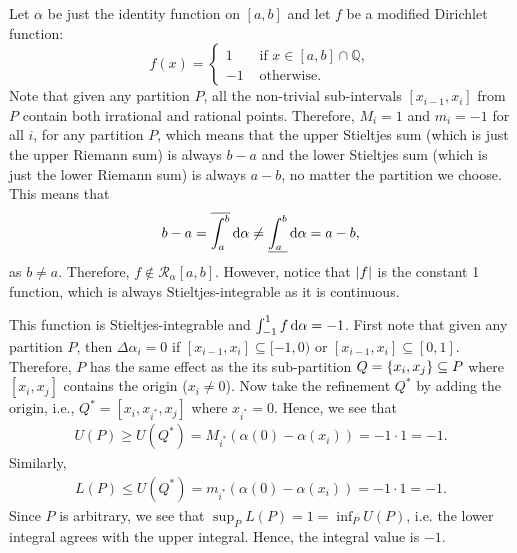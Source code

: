\documentclass[12pt]{article}
\begin{document}
\begin{fproof}[3]
  Let \(\alpha\) be just the identity function on \([a,b]\) and let \(f\) be a modified Dirichlet function:
\[
f(x) = \begin{cases}
  1 &\text{ if } x \in [a,b] \cap \mathbb{Q},\\
  -1 &\text{ otherwise.}
\end{cases}
\]
Note that given any partition \(P\), all the non-trivial sub-intervals \([x_{i-1}, x_i]\) from \(P\) contain both irrational and rational points.
Therefore, \(M_i = 1\) and \(m_i = -1\) for all \(i\), for any partition \(P\), which means that the upper Stieltjes sum (which is just the upper Riemann sum) is always \(b-a\) and the lower Stieltjes sum (which is just the lower Riemann sum) is always \(a-b\), no matter the partition we choose.
This means that
\begin{align*}
  b-a = \overline{\int_{a}^{b}} \mathop{}\!\mathrm{d}\alpha \neq \underline{\int_{a}^{b}} \mathop{}\!\mathrm{d}\alpha = a-b,
\end{align*}
as \(b \neq a\).
Therefore, \(f \notin \mathcal{R}_{\alpha}[a,b]\).
However, notice that \(\left\lvert f \right\rvert\) is the constant 1 function, which is always Stieltjes-integrable as it is continuous.
\end{fproof}
\newpage

\begin{fproof}[4(a)]
  This function is Stieltjes-integrable and \(\int_{-1}^{1} f \mathop{}\!\mathrm{d}\alpha = -1\).
  First note that given any partition \(P\), then \(\Delta \alpha_i = 0\) if \([x_{i-1}, x_i] \subseteq [-1,0)\) or \([x_{i-1}, x_i] \subseteq [0,1]\).
  Therefore, \(P\) has the same effect as the its sub-partition \(Q = \left\{ x_i,x_j \right\}\subseteq P\) where \([x_i,x_j]\) contains the origin (\(x_i \neq 0\)).
  Now take the refinement \(Q^*\) by adding the origin, i.e., \(Q^* = [x_i, x_{i^*}, x_j]\) where \(x_{i^*} = 0\).
  Hence, we see that 
  \begin{align*}
    U(P) \geq U(Q^*) = M_{i^*} (\alpha(0) - \alpha(x_i)) = -1 \cdot 1  = -1.
  \end{align*}
  Similarly,
  \begin{align*}
    L(P) \leq U(Q^*) = m_{i^*} (\alpha(0) - \alpha(x_i)) = -1 \cdot 1 = -1.
  \end{align*}
  Since \(P\) is arbitrary,
  we see that \(\sup_P L(P) = 1 = \inf_P U(P)\), i.e. the lower integral agrees with the upper integral.
  Hence, the integral value is \(-1\).

\end{fproof}
\end{document}
